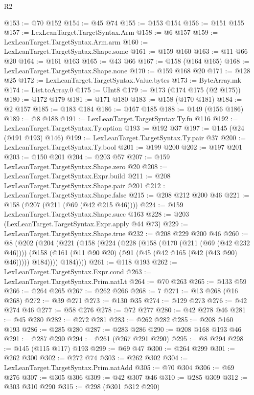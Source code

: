 \begin{lexlean}{R2}
\begin{coremodule}
@153 := @70 @152
@154 := @45 @74
@155 := @153 @154
@156 := @151 @155
@157 := LexLeanTarget.TargetSyntax.Arm
@158 := @6 @157
@159 := LexLeanTarget.TargetSyntax.Arm.arm
@160 := LexLeanTarget.TargetSyntax.Shape.some
@161 := @159 @160
@163 := @11 @66 @20
@164 := @161 @163
@165 := @43 @66
@167 := @158 (@164 @165)
@168 := LexLeanTarget.TargetSyntax.Shape.none
@170 := @159 @168 @20
@171 := @128 @25
@172 := LexLeanTarget.TargetSyntax.Value.bytes
@173 := ByteArray.mk
@174 := List.toArray.{0}
@175 := UInt8
@179 := @173 (@174 @175 (@2 @175))
@180 := @172 @179
@181 := @171 @180
@183 := @158 (@170 @181)
@184 := @2 @157
@185 := @183 @184
@186 := @167 @185
@188 := @149 (@156 @186)
@189 := @8 @188
@191 := LexLeanTarget.TargetSyntax.Ty.fn @116
@192 := LexLeanTarget.TargetSyntax.Ty.option
@193 := @192 @37
@197 := @145 (@24 (@191 @193) @146)
@199 := LexLeanTarget.TargetSyntax.Ty.pair @37
@200 := LexLeanTarget.TargetSyntax.Ty.bool
@201 := @199 @200
@202 := @197 @201
@203 := @150 @201
@204 := @203 @57
@207 := @159 LexLeanTarget.TargetSyntax.Shape.zero @20
@208 := LexLeanTarget.TargetSyntax.Expr.build
@211 := @208 LexLeanTarget.TargetSyntax.Shape.pair @201
@212 := LexLeanTarget.TargetSyntax.Shape.false
@215 := @208 @212 @200 @46
@221 := @158 (@207 (@211 (@69 (@42 @215 @46))))
@224 := @159 LexLeanTarget.TargetSyntax.Shape.succ @163
@228 := @203 (LexLeanTarget.TargetSyntax.Expr.apply @44 @73)
@229 := LexLeanTarget.TargetSyntax.Shape.true
@232 := @208 @229 @200 @46
@260 := @8
    (@202
      (@204
        (@221
          (@158
            (@224
              (@228
                (@158
                  (@170 (@211 (@69 (@42 @232 @46))))
                  (@158 (@161 (@11 @90 @20) (@91 (@45 (@42 @165 (@42 (@43 @90) @46))))) @184))))
            @184))))
@261 := @118 @193
@262 := LexLeanTarget.TargetSyntax.Expr.cond
@263 := LexLeanTarget.TargetSyntax.Prim.natLt
@264 := @70 @263
@265 := @133 @59
@266 := @264 @265
@267 := @262 @266
@268 := 7
@271 := @13 @268 (@16 @268)
@272 := @39 @271
@273 := @130 @35
@274 := @129 @273
@276 := @42 @274 @46
@277 := @58 @276
@278 := @72 @277
@280 := @42 @278 @46
@281 := @45 @280
@282 := @272 @281
@283 := @262 @282
@285 := @208 @160 @193
@286 := @285 @280
@287 := @283 @286
@290 := @208 @168 @193 @46
@291 := @287 @290
@294 := @261 (@267 @291 @290)
@295 := @8 @294
@298 := @145 (@115 @117) @193
@299 := @69 @47
@300 := @264 @299
@301 := @262 @300
@302 := @272 @74
@303 := @262 @302
@304 := LexLeanTarget.TargetSyntax.Prim.natAdd
@305 := @70 @304
@306 := @69 @276
@307 := @305 @306
@309 := @42 @307 @46
@310 := @285 @309
@312 := @303 @310 @290
@315 := @298 (@301 @312 @290)

\end{coremodule}
\end{lexlean}
